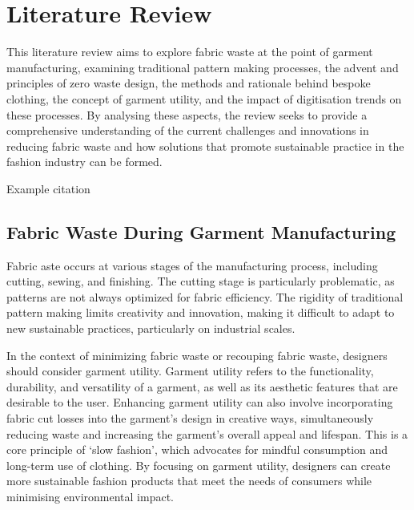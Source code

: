 \chapter{Literature Review}
This literature review aims to explore fabric waste at the point of garment manufacturing, examining traditional pattern making processes, the advent and principles of zero waste design, the methods and rationale behind bespoke clothing, the concept of garment utility, and the impact of digitisation trends on these processes. By analysing these aspects, the review seeks to provide a comprehensive understanding of the current challenges and innovations in reducing fabric waste and how solutions that promote sustainable practice in the fashion industry can be formed. 

Example citation \cite{aldrich_metric_2015}

\section{Fabric Waste During Garment Manufacturing}
Fabric aste occurs at various stages of the manufacturing process, including cutting, sewing, and finishing. The cutting stage is particularly problematic, as patterns are not always optimized for fabric efficiency. The rigidity of traditional pattern making limits creativity and innovation, making it difficult to adapt to new sustainable practices, particularly on industrial scales.

In the context of minimizing fabric waste or recouping fabric waste, designers should consider garment utility. Garment utility refers to the functionality, durability, and versatility of a garment, as well as its aesthetic features that are desirable to the user. Enhancing garment utility can also involve incorporating fabric cut losses into the garment’s design in creative ways, simultaneously reducing waste and increasing the garment’s overall appeal and lifespan. This is a core principle of ‘slow fashion’, which advocates for mindful consumption and long-term use of clothing. By focusing on garment utility, designers can create more sustainable fashion products that meet the needs of consumers while minimising environmental impact.

